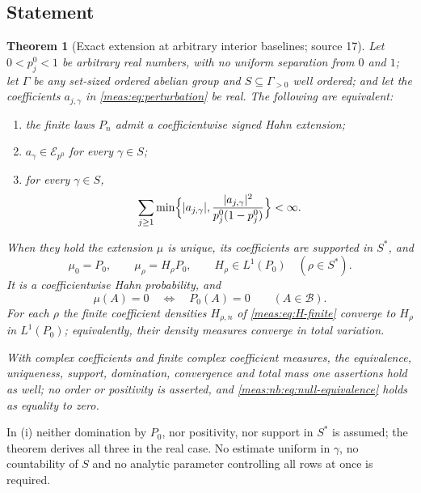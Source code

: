 \documentclass[11pt]{article}
\numberwithin{equation}{section}
\newtheorem{theorem}{Theorem}[section]
\theoremstyle{definition}
\theoremstyle{remark}
\newcommand{\B}{\mathcal B}
\newcommand{\abs}[1]{\lvert#1\rvert}
\newcommand{\Erow}{\mathcal E_{p^0}}
\begin{document}
\subsection{Statement}

\begin{theorem}[Exact extension at arbitrary interior baselines; source 17]
\label{meas:nb:thm:hahn}
Let $0<p_j^0<1$ be arbitrary real numbers, with no uniform separation from $0$ and
$1$; let $\Gamma$ be any set-sized ordered abelian group and $S\subseteq\Gamma_{>0}$
well ordered; and let the coefficients $a_{j,\gamma}$ in \eqref{meas:eq:perturbation}
be real. The following are equivalent:
\begin{enumerate}[label=(\roman*)]
\item the finite laws $P_n$ admit a coefficientwise signed Hahn extension;
\item $a_\gamma\in\Erow$ for every $\gamma\in S$;
\item for every $\gamma\in S$,
\begin{equation}\label{meas:nb:eq:main-modular}
 \sum_{j\ge1}\min\Bigl\{\abs{a_{j,\gamma}},\frac{\abs{a_{j,\gamma}}^2}{p_j^0(1-p_j^0)}\Bigr\}<\infty .
\end{equation}
\end{enumerate}
When they hold the extension $\mu$ is unique, its coefficients are supported in
$S^*$, and
\begin{equation}\label{meas:nb:eq:hahn-density}
 \mu_0=P_0,\qquad \mu_\rho=H_\rho P_0,\qquad H_\rho\in L^1(P_0)\quad(\rho\in S^*).
\end{equation}
It is a coefficientwise Hahn probability, and
\begin{equation}\label{meas:nb:eq:null-equivalence}
 \mu(A)=0\quad\Longleftrightarrow\quad P_0(A)=0\qquad(A\in\B).
\end{equation}
For each $\rho$ the finite coefficient densities $H_{\rho,n}$ of
\eqref{meas:eq:H-finite} converge to $H_\rho$ in $L^1(P_0)$; equivalently, their
density measures converge in total variation.

With complex coefficients and finite complex coefficient measures, the
equivalence, uniqueness, support, domination, convergence and total mass one
assertions hold as well; no order or positivity is asserted, and
\eqref{meas:nb:eq:null-equivalence} holds as equality to zero.
\end{theorem}

In (i) neither domination by $P_0$, nor positivity, nor support in $S^*$ is
assumed; the theorem derives all three in the real case. No estimate uniform in
$\gamma$, no countability of $S$ and no analytic parameter controlling all rows at
once is required.
\end{document}
